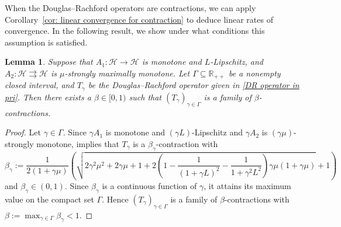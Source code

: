\documentclass[a4paper,12pt]{article}
\newtheorem{lemma}[theorem]{Lemma}
\newcommand{\setto}{\rightrightarrows}
\begin{document}
When the Douglas--Rachford operators are contractions, we can apply Corollary~\ref{cor: linear convergence for contraction} to deduce linear rates of convergence. In the following result, we show under what conditions this assumption is satisfied.
\begin{lemma}\label{lemma:uniform contraction of DR}
     Suppose that $A_1:\mathcal{H}\rightarrow\mathcal{H}$ is monotone and $L$-Lipschitz, and $A_2:\mathcal{H}\setto\mathcal{H}$ is $\mu$-strongly maximally monotone. Let $\Gamma\subseteq\mathbb{R}_{++}$ be a nonempty closed interval, and $T_\gamma$ be the Douglas--Rachford operator given in \eqref{DR operator in pri}. Then there exists a $\beta\in[0,1)$ such that  $(T_{\gamma})_{\gamma\in\Gamma}$ is a family of $\beta$-contractions.
\end{lemma}
\begin{proof}
    Let $\gamma\in\Gamma$. Since $\gamma A_1$ is monotone and $(\gamma L)$-Lipschitz and $\gamma A_2$ is $(\gamma\mu)$-strongly monotone, \cite[Theorem~4.3]{moursi2019douglas} implies that $T_\gamma$ is a $\beta_\gamma$-contraction with 
    $$ \beta_\gamma := \frac{1}{2(1+\gamma\mu)}\left(\sqrt{2\gamma^2\mu^2+2\gamma\mu+1+2\left(1-\frac{1}{(1+\gamma L)^2}-\frac{1}{1+\gamma^2L^2}\right)\gamma\mu(1+\gamma\mu)}+1\right)$$ and $\beta_\gamma\in(0,1)$. Since $\beta_\gamma$ is a continuous function of $\gamma$, it attains its maximum value on the compact set $\Gamma$. Hence $(T_\gamma)_{\gamma\in\Gamma}$ is a family of $\beta$-contractions with $\beta:=\max_{\gamma\in\Gamma}\beta_\gamma<1$.
    
\end{proof}
\end{document}
